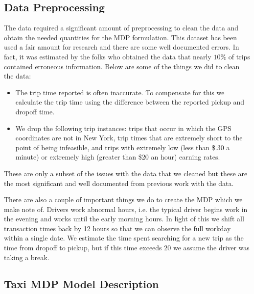\documentclass{article}
\begin{document}
\subsection{Data Preprocessing}
The data required a significant amount of preprocessing to clean the data and obtain the needed quantities for the MDP formulation. This dataset has been used a fair amount for research and there are some well documented errors. In fact, it was estimated by the folks who obtained the data that nearly $10\%$ of trips contained erroneous information. Below are some of the things we did to clean the data:
\begin{itemize}
\item The trip time reported is often inaccurate. To compensate for this we calculate the trip time using the difference between the reported pickup and dropoff time.
\item We drop the following trip instances: trips that occur in which the GPS coordinates are not in New York, trip times that are extremely short to the point of being infeasible, and trips with extremely low (less than \$.30 a minute) or extremely high (greater than \$20 an hour) earning rates.
\end{itemize}
These are only a subset of the issues with the data that we cleaned but these are the most significant and well documented from previous work with the data. 

There are also a couple of important things we do to create the MDP which we make note of. Drivers work abnormal hours, i.e. the typical driver begins work in the evening and works until the early morning hours. In light of this we shift all transaction times back by 12 hours so that we can observe the full workday within a single date. We estimate the time spent searching for a new trip as the time from dropoff to pickup, but if this time exceeds 20 we assume the driver was taking a break.

\subsection{Taxi MDP Model Description}\label{mdp}
\end{document}
